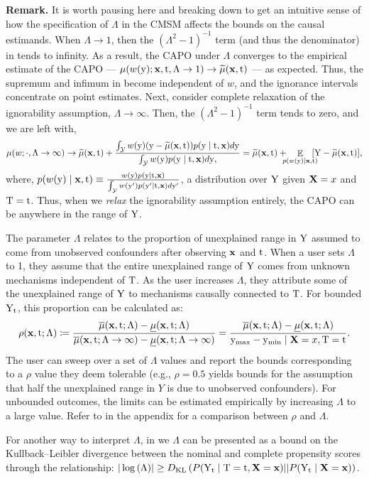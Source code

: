 \textbf{Remark.} It is worth pausing here and breaking down  to get an intuitive sense of how the specification of $\Lambda$ in the CMSM affects the bounds on the causal estimands. 
When $\Lambda \to 1$, then the $(\Lambda^2 - 1)^{-1}$ term (and thus the denominator) in  tends to infinity.
As a result, the CAPO under $\Lambda$ converges to the empirical estimate of the CAPO — $\mu(w(\mathrm{y}); \mathbf{x}, \mathrm{t}, \Lambda \to 1) \to \widetilde{\mu}(\mathbf{x}, \mathrm{t})$ — as expected.
Thus, the supremum and infimum in  become independent of $w$, and the ignorance intervals concentrate on point estimates.
Next, consider complete relaxation of the ignorability assumption, $\Lambda \to \infty$. Then, the $(\Lambda^2 - 1)^{-1}$ term tends to zero, and we are left with,
\begin{equation*}
    \begin{split}
        \mu(w; \cdot, \Lambda \to \infty)
        \to \mut(\x, \tf) + \frac{\int_\Ycal w(\y) (\y - \mut(\x, \tf)) p(\y \mid \tf, \x)d\y}{\int_\Ycal w(\y)p(\y \mid \tf, \x)d\y,}
        = \mut(\x, \tf) + \!\!\!\! \E_{p(w(\y) \mid \x, \tf)} \!\!\!\! [\Y - \mut(\x, \tf)],
    \end{split}
\end{equation*}
where, $p(w(\mathrm{y}) \mid \mathbf{x}, \mathrm{t}) \equiv \frac{w(\mathrm{y}) p(\mathrm{y} \mid \mathrm{t}, \mathbf{x})}{\int_{\mathcal{Y}} w(\mathrm{y}')p(\mathrm{y}' \mid \mathrm{t}, \mathbf{x})d\mathrm{y}'}$, a distribution over $\mathrm{Y}$ given $\mathbf{X}=x$ and $\mathrm{T}=\mathrm{t}$.
Thus, when we \emph{relax} the ignorability assumption entirely, the CAPO can be anywhere in the range of $\mathrm{Y}$.

The parameter $\Lambda$ relates to the proportion of unexplained range in $\mathrm{Y}$ assumed to come from unobserved confounders after observing $\mathbf{x}$ and $\mathrm{t}$. 
When a user sets $\Lambda$ to 1, they assume that the entire unexplained range of $\mathrm{Y}$ comes from unknown mechanisms independent of $\mathrm{T}$. 
As the user increases $\Lambda$, they attribute some of the unexplained range of $\mathrm{Y}$ to mechanisms causally connected to $\mathrm{T}$.
For bounded $\mathrm{Y}_{\mathrm{t}}$, this proportion can be calculated as:
\begin{equation*}
        \rho(\mathbf{x}, \mathrm{t}; \Lambda) \coloneqq \frac{\overline{\mu}(\mathbf{x}, \mathrm{t}; \Lambda) - \underline{\mu}(\mathbf{x}, \mathrm{t}; \Lambda)}{\overline{\mu}(\mathbf{x}, \mathrm{t}; \Lambda \to \infty) - \underline{\mu}(\mathbf{x}, \mathrm{t}; \Lambda \to \infty)}
        = \frac{\overline{\mu}(\mathbf{x}, \mathrm{t}; \Lambda) - \underline{\mu}(\mathbf{x}, \mathrm{t}; \Lambda)}{\mathrm{y}_{\max} - \mathrm{y}_{\min} \mid \mathbf{X}=x, \mathrm{T}=\mathrm{t}}.
\end{equation*}
The user can sweep over a set of $\Lambda$ values and report the bounds corresponding to a $\rho$ value they deem tolerable (e.g., $\rho=0.5$ yields bounds for the assumption that half the unexplained range in $Y$ is due to unobserved confounders). For unbounded outcomes, the limits can be estimated empirically by increasing $\Lambda$ to a large value. Refer to  in the appendix for a comparison between $\rho$ and $\Lambda$.

For another way to interpret $\Lambda$, in  we $\Lambda$ can be presented as a bound on the Kullback–Leibler divergence between the nominal and complete propensity scores  through the relationship: $|\log{\left(\Lambda\right)}| \geq  D_{\mathrm{KL}}\left( P(\mathrm{Y}_{\mathrm{t}} \mid \mathrm{T}=\mathrm{t}, \mathbf{X}=\mathbf{x}) || P(\mathrm{Y}_{\mathrm{t}} \mid \mathbf{X}=\mathbf{x}) \right)$.